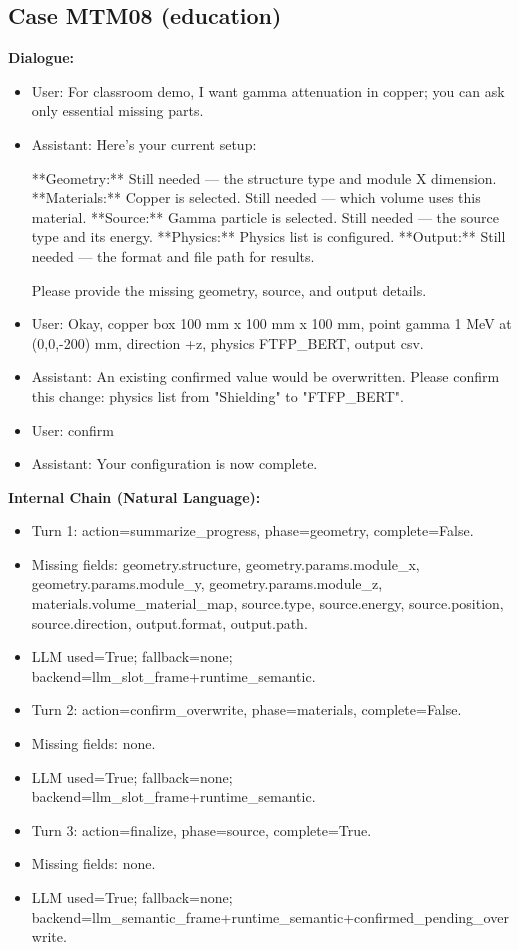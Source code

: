 \documentclass[11pt]{ctexart}
\begin{document}
\subsection{Case MTM08 (education)}
\textbf{Dialogue:}
\begin{itemize}
\item User: For classroom demo, I want gamma attenuation in copper; you can ask only essential missing parts.
\item Assistant: Here's your current setup:

**Geometry:** Still needed — the structure type and module X dimension.
**Materials:** Copper is selected. Still needed — which volume uses this material.
**Source:** Gamma particle is selected. Still needed — the source type and its energy.
**Physics:** Physics list is configured.
**Output:** Still needed — the format and file path for results.

Please provide the missing geometry, source, and output details.
\item User: Okay, copper box 100 mm x 100 mm x 100 mm, point gamma 1 MeV at (0,0,-200) mm, direction +z, physics FTFP\_BERT, output csv.
\item Assistant: An existing confirmed value would be overwritten. Please confirm this change: physics list from "Shielding" to "FTFP\_BERT".
\item User: confirm
\item Assistant: Your configuration is now complete.
\end{itemize}
\textbf{Internal Chain (Natural Language):}
\begin{itemize}
\item Turn 1: action=summarize\_progress, phase=geometry, complete=False.
\item Missing fields: geometry.structure, geometry.params.module\_x, geometry.params.module\_y, geometry.params.module\_z, materials.volume\_material\_map, source.type, source.energy, source.position, source.direction, output.format, output.path.
\item LLM used=True; fallback=none; backend=llm\_slot\_frame+runtime\_semantic.
\item Turn 2: action=confirm\_overwrite, phase=materials, complete=False.
\item Missing fields: none.
\item LLM used=True; fallback=none; backend=llm\_slot\_frame+runtime\_semantic.
\item Turn 3: action=finalize, phase=source, complete=True.
\item Missing fields: none.
\item LLM used=True; fallback=none; backend=llm\_semantic\_frame+runtime\_semantic+confirmed\_pending\_overwrite.
\end{itemize}
\end{document}
